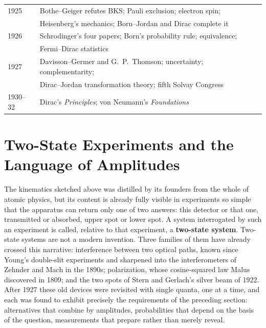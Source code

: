 \begin{table}[htbp!]
\begin{tabular}{ll}
        1925 & Bothe--Geiger refutes BKS; Pauli exclusion; electron spin; \\
               & Heisenberg's mechanics; Born--Jordan and Dirac complete it \\
        1926 & Schrodinger's four papers; Born's probability rule; equivalence; \\
               & Fermi--Dirac statistics \\
        1927 & Davisson--Germer and G.~P.~Thomson; uncertainty; complementarity; \\
               & Dirac--Jordan transformation theory; fifth Solvay Congress \\
        1930--32 & Dirac's \emph{Principles}; von Neumann's \emph{Foundations} \\
        \bottomrule
    \end{tabular}
\end{table}

\section{Two-State Experiments and the Language of Amplitudes}
\label{sec:twostate}
The kinematics sketched above was distilled by its founders from the whole of atomic physics, but its content is already fully visible in experiments so simple that the apparatus can return only one of two answers: this detector or that one, transmitted or absorbed, upper spot or lower spot. A system interrogated by such an experiment is called, relative to that experiment, a \textbf{two-state system}. Two-state systems are not a modern invention. Three families of them have already crossed this narrative: interference between two optical paths, known since Young's double-slit experiments and sharpened into the interferometers of Zehnder and Mach in the 1890s; polarization, whose cosine-squared law Malus discovered in 1809; and the two spots of Stern and Gerlach's silver beam of 1922. After 1927 these old devices were revisited with single quanta, one at a time, and each was found to exhibit precisely the requirements of the preceding section: alternatives that combine by amplitudes, probabilities that depend on the basis of the question, measurements that prepare rather than merely reveal.

